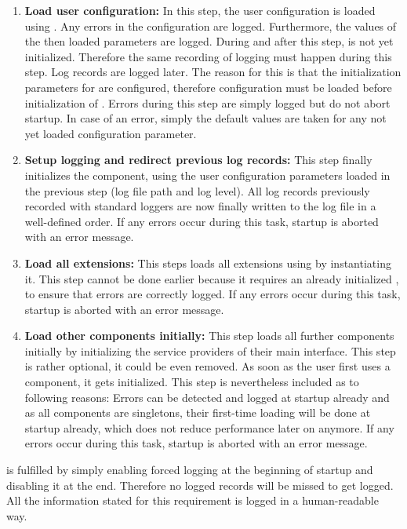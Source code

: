 \begin{enumerate}
	\item \textbf{Load user configuration:} In this step, the user configuration is loaded using \COMPconfiguration{}. Any errors in the configuration are logged. Furthermore, the values of the then loaded parameters are logged. During and after this step, \COMPlogging{} is not yet initialized. Therefore the same recording of logging must happen during this step. Log records are logged later. The reason for this is that the initialization parameters for \COMPlogging{} are configured, therefore configuration must be loaded before initialization of \COMPlogging{}. Errors during this step are simply logged but do not abort \LibName{} startup. In case of an error, simply the default values are taken for any not yet loaded configuration parameter.
	\item \textbf{Setup logging and redirect previous log records:} This step finally initializes the \COMPlogging{} component, using the user configuration parameters loaded in the previous step (log file path and log level). All log records previously recorded with standard loggers are now finally written to the log file in a well-defined order. If any errors occur during this task, \LibName{} startup is aborted with an error message.
	\item \textbf{Load all extensions:} This steps loads all \LibName{} extensions using \COMPextensionManagement{} by instantiating it. This step cannot be done earlier because it requires an already initialized \COMPlogging{}, to ensure that errors are correctly logged. If any errors occur during this task, \LibName{} startup is aborted with an error message.
	\item \textbf{Load other components initially:} This step loads all further \LibName{} components initially by initializing the service providers of their main interface. This step is rather optional, it could be even removed. As soon as the user first uses a component, it gets initialized. This step is nevertheless included as to following reasons: Errors can be detected and logged at startup already and as all components are singletons, their first-time loading will be done at startup already, which does not reduce performance later on anymore. If any errors occur during this task, \LibName{} startup is aborted with an error message.
\end{enumerate}

\REQUcontextVerboseLogging{} is fulfilled by simply enabling forced logging at the beginning of startup and disabling it at the end. Therefore no logged records will be missed to get logged. All the information stated for this requirement is logged in a human-readable way.

